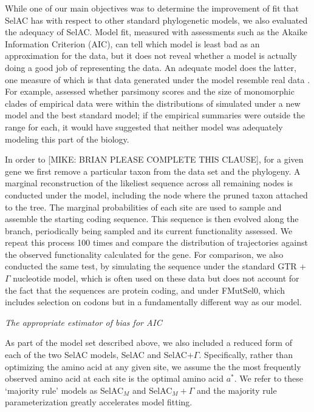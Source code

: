 \documentclass[12pt,letterpaper,fleqn]{article}
\renewcommand{\subsection}[1]{%
\bigskip
\begin{center}
\begin{large}
\normalfont\itshape #1
\end{large}
\end{center}}
\newcommand{\selac}{SelAC\xspace}
\newcommand{\selacplusgamma}{SelAC$+\Gamma$\xspace}
\newcommand{\selacmaj}{SelAC$_{M}$\xspace}
\newcommand{\selacmajplusgamma}{SelAC$_{M}+\Gamma$\xspace}
\newcommand{\aopt}{\ensuremath{a^*}\xspace}
\begin{document}
While one of our main objectives was to determine the improvement of fit that \selac has with respect to other standard phylogenetic models, we also evaluated the adequacy of \selac.
Model fit, measured with assessments such as the Akaike Information Criterion (AIC), can tell which model is least bad as an approximation for the data, but it does not reveal whether a model is actually doing a good job of representing the data. %
An adequate model does the latter, one measure of which is that data generated under the model resemble real data \citep{goldman1993statistical}.
For example, \citet{BeaulieuEtAl2013} assessed whether parsimony scores and the size of monomorphic clades of empirical data were within the distributions of simulated under a new model and the best standard model; if the empirical summaries were outside the range for each, it would have suggested that neither model was adequately modeling this part of the biology.

In order to [MIKE: BRIAN PLEASE COMPLETE THIS CLAUSE], for a given gene we first remove a particular taxon from the data set and the phylogeny.
A marginal reconstruction of the likeliest sequence across all remaining nodes is conducted under the model, including the node where the pruned taxon attached to the tree.
The marginal probabilities of each site are used to sample and assemble the starting coding sequence.
This sequence is then evolved along the branch, periodically being sampled and its current functionality assessed.
We repeat this process 100 times and compare the distribution of trajectories against the observed functionality calculated for the gene.
For comparison, we also conducted the same test, by simulating the sequence under the standard GTR + $\Gamma$ nucleotide model, which is often used on these data but does not account for the fact that the sequences are protein coding, and under FMutSel0, which includes selection on codons but in a fundamentally different way as our model.

\subsection{The appropriate estimator of bias for AIC}
As part of the model set described above, we also included a reduced form of each of the two \selac models, \selac and \selacplusgamma.
Specifically, rather than optimizing the amino acid at any given site, we assume the  the most frequently observed amino acid at each site is the optimal amino acid \aopt.
We refer to these `majority rule' models as \selacmaj and \selacmajplusgamma and the majority rule parameterization greatly accelerates model fitting.
\end{document}
